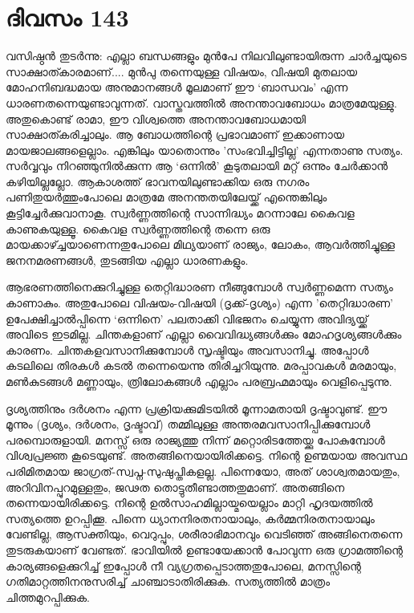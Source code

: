  
\section{ദിവസം 143}


വസിഷ്ഠൻ തുടർന്നു: എല്ലാ ബന്ധങ്ങളും മുൻപേ നിലവിലുണ്ടായിരുന്ന ചാര്‍ച്ചയുടെ  സാക്ഷാത്കാരമാണ്‌....   മുന്‍പു തന്നെയുള്ള  വിഷയം, വിഷയി മുതലായ  മോഹനിബദ്ധമായ അനുമാനങ്ങൾ മൂലമാണ്‌ ഈ ‘ബാന്ധവം’ എന്ന ധാരണതന്നെയുണ്ടാവുന്നത്. വാസ്തവത്തിൽ അനന്താവബോധം മാത്രമേയുള്ളു. അതുകൊണ്ട് രാമാ, ഈ വിശ്വത്തെ അനന്താവബോധമായി സാക്ഷാത്കരിച്ചാലും. ആ ബോധത്തിന്റെ പ്രഭാവമാണ്‌ ഇക്കാണായ മായജാലങ്ങളെല്ലാം. എങ്കിലും യാതൊന്നും 'സംഭവിച്ചിട്ടില്ല' എന്നതാണു സത്യം. സർവ്വവും നിറഞ്ഞുനിൽക്കുന്ന ആ ‘ഒന്നിൽ’ കൂടുതലായി മറ്റ് ഒന്നും ചേർക്കാൻ കഴിയില്ലല്ലോ. ആകാശത്ത് ഭാവനയിലുണ്ടാക്കിയ ഒരു നഗരം പണിതുയർത്തുംപോലെ മാത്രമേ അനന്തതയിലേയ്ക്ക് എന്തെങ്കിലും കൂട്ടിച്ചേർക്കുവാനാകൂ. സ്വർണ്ണത്തിന്റെ സാന്നിദ്ധ്യം മറന്നാലേ കൈവള കാണുകയുള്ളൂ. കൈവള സ്വർണ്ണത്തിന്റെ തന്നെ ഒരു മായക്കാഴ്ച്ചയാണെന്നതുപോലെ മിഥ്യയാണ്‌ രാജ്യം, ലോകം, ആവർത്തിച്ചുള്ള ജനനമരണങ്ങൾ, തുടങ്ങിയ എല്ലാ ധാരണകളും.

ആഭരണത്തിനെക്കുറിച്ചുള്ള തെറ്റിദ്ധാരണ നീങ്ങുമ്പോൾ സ്വർണ്ണമെന്ന സത്യം കാണാകും. അതുപോലെ വിഷയം-വിഷയി (ദൃക്ക്-ദൃശ്യം) എന്ന 'തെറ്റിദ്ധാരണ' ഉപേക്ഷിച്ചാൽപ്പിന്നെ ‘ഒന്നിനെ’ പലതാക്കി വിഭജനം ചെയ്യുന്ന അവിദ്യയ്ക്ക് അവിടെ ഇടമില്ല. ചിന്തകളാണ്‌ എല്ലാ വൈവിദ്ധ്യങ്ങള്‍ക്കും മോഹദൃശ്യങ്ങൾക്കും കാരണം. ചിന്തകളവസാനിക്കുമ്പോൾ സൃഷ്ടിയും അവസാനിച്ചു. അപ്പോൾ കടലിലെ തിരകൾ കടൽ തന്നെയെന്നു തിരിച്ചറിയുന്നു. മരപ്പാവകൾ മരമായും, മൺകുടങ്ങൾ മണ്ണായും, ത്രിലോകങ്ങൾ എല്ലാം പരബ്രഹ്മമായും വെളിപ്പെടുന്നു.

ദൃശ്യത്തിനും ദർശനം എന്ന പ്രക്രിയക്കുമിടയിൽ മൂന്നാമതായി ദൃഷ്ടാവുണ്ട്. ഈ മൂന്നും (ദൃശ്യം, ദർശനം, ദൃഷ്ടാവ്) തമ്മിലുള്ള അന്തരമവസാനിപ്പിക്കുമ്പോൾ പരമ്പൊരുളായി. മനസ്സ് ഒരു രാജ്യത്തു നിന്ന്‌ മറ്റൊരിടത്തേയ്ക്കു പോകുമ്പോൾ വിശ്വപ്രജ്ഞ കൂടെയുണ്ട്. അതങ്ങിനെയായിരിക്കട്ടെ. നിന്റെ ഉണ്മയായ അവസ്ഥ പരിമിതമായ ജാഗ്രത്-സ്വപ്ന-സുഷുപ്തികളല്ല. പിന്നെയോ, അത് ശാശ്വതമായതും, അറിവിനപ്പുറമുള്ളതും, ജഢത തൊട്ടുതീണ്ടാത്തതുമാണ്‌.   അതങ്ങിനെ തന്നെയായിരിക്കട്ടെ. നിന്റെ ഉൽസാഹമില്ലായ്മയെല്ലാം മാറ്റി ഹൃദയത്തിൽ സത്യത്തെ ഉറപ്പിക്കൂ. പിന്നെ ധ്യാനനിരതനായാലും, കർമ്മനിരതനായാലും വേണ്ടില്ല, ആസക്തിയും, വെറുപ്പും, ശരീരാഭിമാനവും വെടിഞ്ഞ് അങ്ങിനെതന്നെ തുടരുകയാണ് വേണ്ടത്. ഭാവിയിൽ ഉണ്ടായേക്കാന്‍ പോവുന്ന ഒരു ഗ്രാമത്തിന്റെ കാര്യങ്ങളെക്കുറിച്ച് ഇപ്പോൾ നീ വ്യഗ്രതപ്പെടാത്തതുപോലെ, മനസ്സിന്റെ ഗതിമാറ്റത്തിനനുസരിച്ച് ചാഞ്ചാടാതിരിക്കുക. സത്യത്തിൽ മാത്രം  ചിത്തമുറപ്പിക്കുക.

